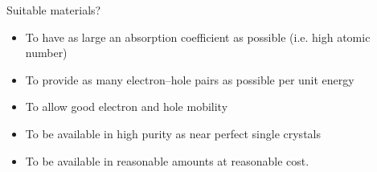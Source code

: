 \begin{frame}{Suitable materials?}


{\small
\begin{itemize}
\item To have as large an absorption coefficient as possible (i.e. high atomic number)
\item To provide as many electron–hole pairs as possible per unit energy
\item To allow good electron and hole mobility
\item To be available in high purity as near perfect single crystals
\item To be available in reasonable amounts at reasonable cost.
\end{itemize}
}


\end{frame}


